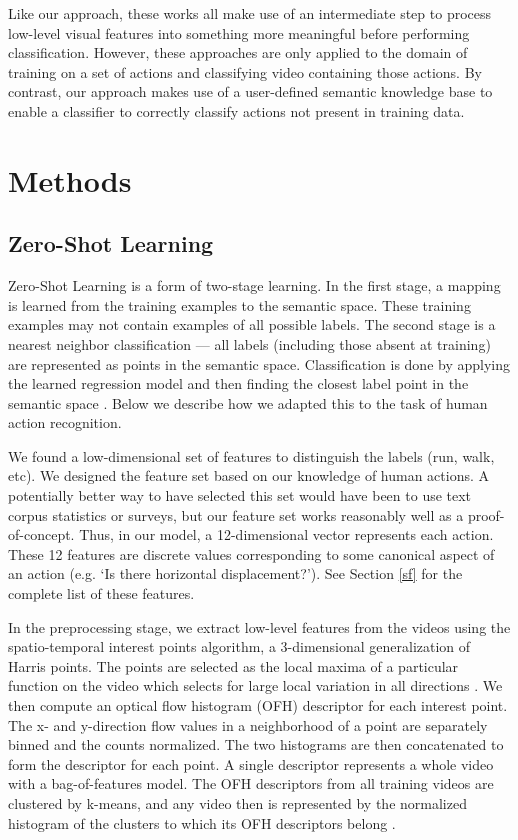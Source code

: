 \documentclass{article}
\begin{document}
Like our approach, these works all make use of an intermediate step to process low-level visual features into something more meaningful before performing classification. However, these approaches are only applied to the domain of training on a set of actions and classifying video containing those actions. By contrast, our approach makes use of a user-defined semantic knowledge base to enable a classifier to correctly classify actions not present in training data.

\section{Methods}
\subsection{Zero-Shot Learning}
Zero-Shot Learning is a form of two-stage learning. In the first stage, a mapping is learned from the training examples to the semantic space. These training examples may not contain examples of all possible labels. The second stage is a nearest neighbor classification --- all labels (including those absent at training) are represented as points in the semantic space.  Classification is done by applying the learned regression model and then finding the closest label point in the semantic space \cite{Palatucci09}.  Below we describe how we adapted this to the task of human action recognition.

We found a low-dimensional set of features to distinguish the labels (run, walk, etc). We designed the feature set based on our knowledge of human actions. A potentially better way to have selected this set would have been to use text corpus statistics or surveys, but our feature set works reasonably well as a proof-of-concept. Thus, in our model, a 12-dimensional vector represents each action. These 12 features are discrete values corresponding to some canonical aspect of an action (e.g. `Is there horizontal displacement?'). See Section \ref{sf} for the complete list of these features.

In the preprocessing stage, we extract low-level features from the videos using the spatio-temporal interest points algorithm, a 3-dimensional generalization of Harris points. The points are selected as the local maxima of a particular function on the video which selects for large local variation in all directions \cite{Laptev05}. We then compute an optical flow histogram (OFH) descriptor for each interest point. The x- and y-direction flow values in a neighborhood of a point are separately binned and the counts normalized. The two histograms are then concatenated to form the descriptor for each point. A single descriptor represents a whole video with a bag-of-features model. The OFH descriptors from all training videos are clustered by k-means, and any video then is represented by the normalized histogram of the clusters to which its OFH descriptors belong \cite{Laptev04}.
\end{document}
